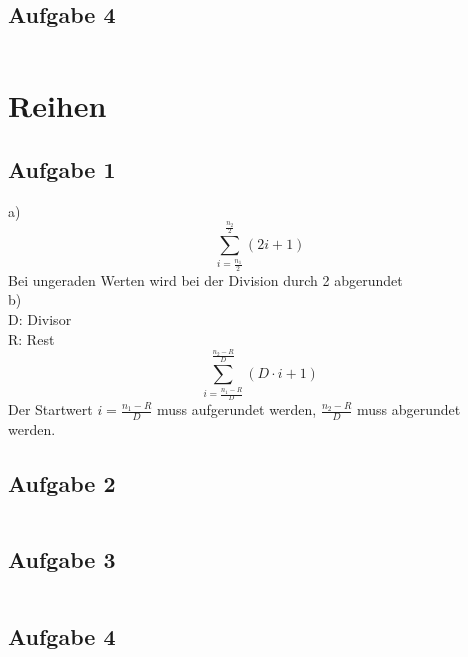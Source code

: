 \subsection{Aufgabe 4}
\[  \]
\[  \]
\[  \]

\section{Reihen}
\subsection{Aufgabe 1}
a)
\[ \sum_{i=\frac{n_1}{2}}^{\frac{n_2}{2}}(2 i + 1) \]
Bei ungeraden Werten wird bei der Division durch 2 abgerundet\\
b)\\
D: Divisor\\
R: Rest
\[ \sum_{i=\frac{n_1 - R}{D}}^{\frac{n_2 - R}{D}}(D \cdot i + 1) \]
Der Startwert $i=\frac{n_1 - R}{D}$ muss aufgerundet werden, $\frac{n_2 - R}{D}$ muss abgerundet werden. 

\subsection{Aufgabe 2}
\[  \]
\[  \]
\[  \]

\subsection{Aufgabe 3}
\[  \]
\[  \]
\[  \]

\subsection{Aufgabe 4}
\[  \]
\[  \]
\[  \]
